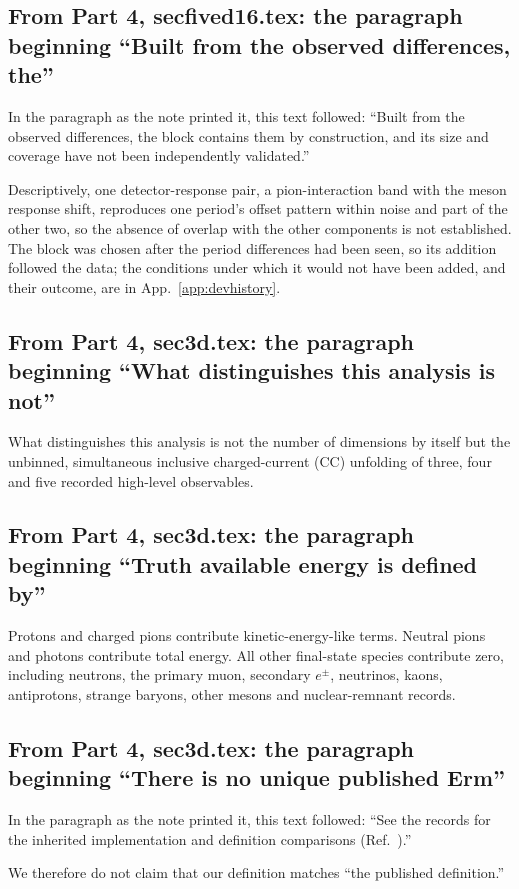 \subsection{From Part 4, secfived16.tex: the paragraph beginning ``Built from the observed differences, the''}
In the paragraph as the note printed it, this text followed: ``Built from the observed differences, the block contains them by construction, and its size and coverage have not been independently validated.''\par
Descriptively, one detector-response pair, a pion-interaction band with the meson response shift, reproduces one period's offset pattern within noise and part of the other two, so the absence of overlap with the other components is not established. The block was chosen after the period differences had been seen, so its addition followed the data; the conditions under which it would not have been added, and their outcome, are in App.~\ref{app:devhistory}.

\subsection{From Part 4, sec3d.tex: the paragraph beginning ``What distinguishes this analysis is not''}
What distinguishes this analysis is not the number of dimensions by itself but the unbinned, simultaneous inclusive charged-current (CC) unfolding of three, four and five recorded high-level observables.

\subsection{From Part 4, sec3d.tex: the paragraph beginning ``Truth available energy is defined by''}
Protons and charged pions contribute kinetic-energy-like terms. Neutral pions and photons contribute total energy. All other final-state species contribute zero, including neutrons, the primary muon, secondary $e^\pm$, neutrinos, kaons, antiprotons, strange baryons, other mesons and nuclear-remnant records.

\subsection{From Part 4, sec3d.tex: the paragraph beginning ``There is no unique published Erm''}
In the paragraph as the note printed it, this text followed: ``See the records for the inherited implementation and definition comparisons (Ref.~\cite{NoteRecords2026}).''\par
We therefore do not claim that our definition matches ``the published definition.''

